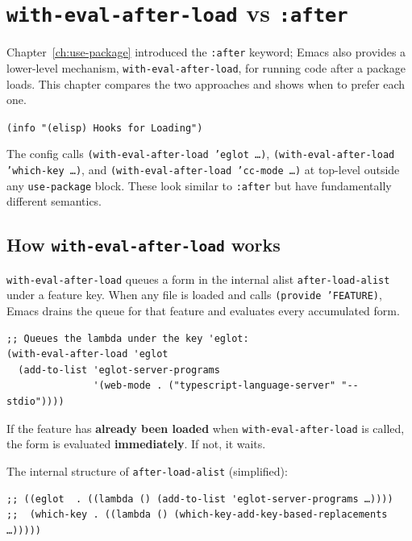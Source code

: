 \chapter{\texttt{with-eval-after-load} vs \texttt{:after}}
\label{ch:with-eval-after-load}
\minitoc\label{with-eval-after-load-vs-after}

Chapter~\ref{ch:use-package} introduced the \texttt{:after} keyword;
Emacs also provides a lower-level mechanism,
\texttt{with-eval-after-load}, for running code after a package loads.
This chapter compares the two approaches and shows when to prefer
each one.

\texttt{(info "(elisp) Hooks for Loading")}

The config calls \texttt{(with-eval-after-load 'eglot …)}, \texttt{(with-eval-after-load 'which-key …)}, and \texttt{(with-eval-after-load 'cc-mode …)} at top-level outside any \texttt{use-package} block. These look similar to \texttt{:after} but have fundamentally different semantics.

\section{How \texttt{with-eval-after-load} works}\label{how-with-eval-after-load-works}

\texttt{with-eval-after-load} queues a form in the internal alist \texttt{after-load-alist} under a feature key. When any file is loaded and calls \texttt{(provide 'FEATURE)}, Emacs drains the queue for that feature and evaluates every accumulated form.

\begin{verbatim}
;; Queues the lambda under the key 'eglot:
(with-eval-after-load 'eglot
  (add-to-list 'eglot-server-programs
               '(web-mode . ("typescript-language-server" "--stdio"))))
\end{verbatim}

If the feature has \textbf{already been loaded} when \texttt{with-eval-after-load} is called, the form is evaluated \textbf{immediately}. If not, it waits.

The internal structure of \texttt{after-load-alist} (simplified):

\begin{verbatim}
;; ((eglot  . ((lambda () (add-to-list 'eglot-server-programs …))))
;;  (which-key . ((lambda () (which-key-add-key-based-replacements …)))))
\end{verbatim}

